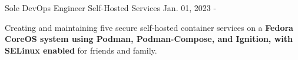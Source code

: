 \begin{cventries}
    \cventry
    {Sole DevOps Engineer}
    {Self-Hosted Services}
    {}
    {Jan. 01, 2023 - }
    {
      \begin{cvitems}
        \item {Creating and maintaining five secure self-hosted container services on a \textbf{Fedora CoreOS system using Podman, Podman-Compose, and Ignition, with SELinux enabled} for friends and family.}
      \end{cvitems}
    }
\end{cventries}
